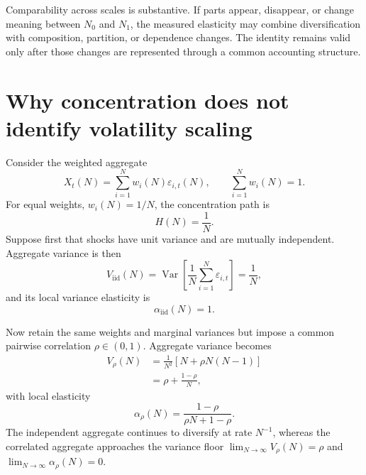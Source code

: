\documentclass[preprint,12pt,authoryear]{elsarticle}
\begin{document}
Comparability across scales is substantive. If parts appear, disappear,
or change meaning between $N_0$ and $N_1$, the measured elasticity may
combine diversification with composition, partition, or dependence
changes. The identity remains valid only after those changes are
represented through a common accounting structure.

\section{Why concentration does not identify volatility scaling}
\label{sec:concentration_scaling}

Consider the weighted aggregate
\begin{equation}
\label{eq:weighted_aggregate}
    X_t(N)
    =
    \sum_{i=1}^{N}w_i(N)\varepsilon_{i,t}(N),
    \qquad
    \sum_{i=1}^{N}w_i(N)=1.
\end{equation}
For equal weights, $w_i(N)=1/N$, the concentration path is
\begin{equation}
\label{eq:equal_weight_concentration}
    H(N)=\frac{1}{N}.
\end{equation}
Suppose first that shocks have unit variance and are mutually
independent. Aggregate variance is then
\begin{equation}
\label{eq:iid_variance}
    V_{\mathrm{iid}}(N)
    =
    \operatorname{Var}\!\left[
        \frac{1}{N}\sum_{i=1}^{N}\varepsilon_{i,t}
    \right]
    =\frac{1}{N},
\end{equation}
and its local variance elasticity is
\begin{equation}
    \alpha_{\mathrm{iid}}(N)=1.
\end{equation}

Now retain the same weights and marginal variances but impose a common
pairwise correlation $\rho\in(0,1)$. Aggregate variance becomes
\begin{align}
\label{eq:correlated_variance}
    V_{\rho}(N)
    &=
    \frac{1}{N^2}\left[N+\rho N(N-1)\right]
    \nonumber\\
    &=
    \rho+\frac{1-\rho}{N},
\end{align}
with local elasticity
\begin{equation}
\label{eq:correlated_alpha}
    \alpha_{\rho}(N)
    =
    \frac{1-\rho}{\rho N+1-\rho}.
\end{equation}
The independent aggregate continues to diversify at rate $N^{-1}$,
whereas the correlated aggregate approaches the variance floor
$\lim_{N\to\infty}V_{\rho}(N)=\rho$ and
$\lim_{N\to\infty}\alpha_{\rho}(N)=0$.
\end{document}
